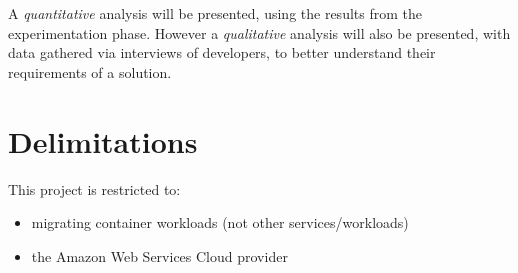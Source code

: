 \noindent A \textit{quantitative} analysis will be presented, using the results from the experimentation phase.
However a \textit{qualitative} analysis will also be presented, with data gathered via interviews of developers, to better understand their requirements of a solution.

\chapter{Delimitations}
This project is restricted to:
\begin{itemize}
  \item migrating container workloads (not other services/workloads)
  \item the Amazon Web Services Cloud provider
\end{itemize}

